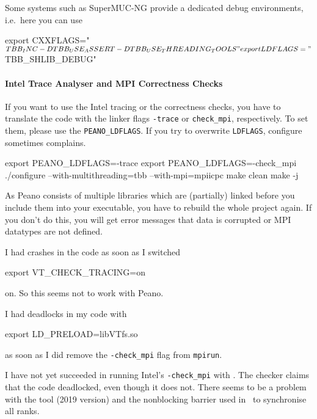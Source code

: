 \noindent
Some systems such as SuperMUC-NG provide a dedicated debug environments,
i.e.~here you can use
\begin{code}
 export CXXFLAGS="$TBB_INC -DTBB_USE_ASSERT -DTBB_USE_THREADING_TOOLS "
 export LDFLAGS="$TBB_SHLIB_DEBUG"
\end{code}


\paragraph{Intel Trace Analyser and MPI Correctness Checks}

If you want to use the Intel tracing or the correctness checks, you have to
translate the code with the linker flags \texttt{-trace} or \texttt{check\_mpi},
respectively.
To set them, please use the \texttt{PEANO\_LDFLAGS}.
If you try to overwrite \texttt{LDFLAGS}, configure sometimes complains.


\begin{code}
 export PEANO_LDFLAGS=-trace
 export PEANO_LDFLAGS=-check_mpi
 ./configure --with-multithreading=tbb --with-mpi=mpiicpc
 make clean
 make -j
\end{code}


\noindent
As Peano consists of multiple libraries which are (partially) linked before you
include them into your executable, you have to rebuild the whole project again.
If you don't do this, you will get error messages that data is corrupted or MPI
datatypes are not defined.



\begin{remark}
 I had crashes in the code as soon as I switched
 \begin{code}
 export VT_CHECK_TRACING=on
 \end{code}
 on. So this seems not to work with Peano.
\end{remark}



\begin{remark}
 I had deadlocks in my code with
 \begin{code}
 export LD_PRELOAD=libVTfs.so
 \end{code}
 as soon as I did remove the \texttt{-check\_mpi} flag from \texttt{mpirun}.
\end{remark}



\begin{remark}
 I have not yet succeeded in running Intel's \texttt{-check\_mpi} with \ExaHyPE.
 The checker claims that the code deadlocked, even though it does not. There
 seems to be a problem with the tool (2019 version) and the nonblocking barrier
 used in \ExaHyPE\ to synchronise all ranks.
\end{remark}


